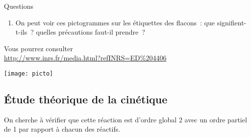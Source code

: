 \documentclass[a4paper, 11pt, final, garamond]{book}
\begin{document}
\vspace{-10pt}
\begin{rexem}{Questions}
    \begin{minipage}{0.55\linewidth}
        \begin{enumerate}[label=\sqenumi, start=3]
            \item On peut voir ces pictogrammes sur les étiquettes des flacons~: que
                signifient-t-ils~? quelles précautions faut-il prendre~?
        \end{enumerate}
        Vous pourrez consulter\\
        \url{http://www.inrs.fr/media.html?refINRS=ED%204406}
    \end{minipage}
    \hfill
    \begin{minipage}{0.40\linewidth}
        \begin{center}
            \texttt{[image: picto]}
        \end{center} 
    \end{minipage}
\end{rexem}

\subsection{\'Etude théorique de la cinétique}

On cherche à vérifier que cette réaction est d'ordre global 2 avec un ordre
partiel de 1 par rapport à chacun des réactifs.
\end{document}
